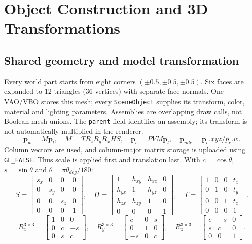 \section{Object Construction and 3D Transformations}\subsection{Shared geometry and model transformation}
Every world part starts from eight corners $(\pm0.5,\pm0.5,\pm0.5)$. Six faces are expanded to 12 triangles (36 vertices) with separate face normals. One VAO/VBO stores this mesh; every \texttt{SceneObject} supplies its transform, color, material and lighting parameters. Assemblies are overlapping draw calls, not Boolean mesh unions. The \texttt{parent} field identifies an assembly; its transform is not automatically multiplied in the renderer.
\begin{equation}
 \mathbf p_w=M\mathbf p_l,\quad M=T R_zR_yR_xHS,\quad
 \mathbf p_c=PVM\mathbf p_l,\quad \mathbf p_{ndc}=\mathbf p_c.xyz/p_c.w.
\end{equation}
Column vectors are used, and column-major matrix storage is uploaded using \texttt{GL\_FALSE}. Thus scale is applied first and translation last. With $c=\cos\theta$, $s=\sin\theta$ and $\theta=\pi\theta_{deg}/180$:
\[
 S=\begin{bmatrix}s_x&0&0&0\\0&s_y&0&0\\0&0&s_z&0\\0&0&0&1\end{bmatrix},\quad
 H=\begin{bmatrix}1&h_{xy}&h_{xz}&0\\h_{yx}&1&h_{yz}&0\\h_{zx}&h_{zy}&1&0\\0&0&0&1\end{bmatrix},\quad
 T=\begin{bmatrix}1&0&0&t_x\\0&1&0&t_y\\0&0&1&t_z\\0&0&0&1\end{bmatrix}.
\]
\[
 R_x^{3\times3}=\begin{bmatrix}1&0&0\\0&c&-s\\0&s&c\end{bmatrix},\quad
 R_y^{3\times3}=\begin{bmatrix}c&0&s\\0&1&0\\-s&0&c\end{bmatrix},\quad
 R_z^{3\times3}=\begin{bmatrix}c&-s&0\\s&c&0\\0&0&1\end{bmatrix}.
\]
